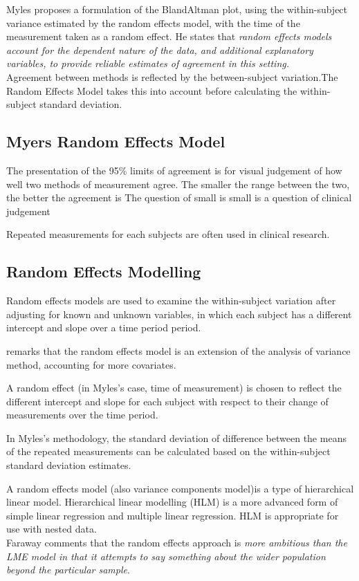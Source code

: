 \documentclass[12pt, a4paper]{report}
\theoremstyle{plain}
\theoremstyle{definition}
\theoremstyle{remark}
\begin{document}
Myles proposes a formulation of the BlandAltman
plot, using the within-subject variance estimated by the random
effects model, with the time of the measurement taken as a random
effect. He states that \emph{random effects models account for the
	dependent nature of the data, and additional explanatory
	variables, to provide reliable estimates of agreement in this
	setting.}
\\
Agreement between methods is reflected by the between-subject
variation.The Random Effects Model takes this into account before
calculating the within-subject standard deviation.

\subsection{Myers Random Effects Model} The presentation of the
95\% limits of agreement is for visual judgement of how well two
methods of measurement agree. The smaller the range between the
two, the better the agreement is The question of small is small is
a question of clinical judgement


Repeated measurements for each subjects are often used in clinical
research.



\subsection{Random Effects Modelling}
Random effects models are used to examine the within-subject
variation after adjusting for known and unknown variables, in
which each subject has a different intercept and slope over a time
period period.


\citet{Myles} remarks that the random effects model is an
extension of the analysis of variance method, accounting for more
covariates.

A random effect (in Myles's case, time of measurement) is chosen
to reflect the different intercept and slope for each subject with
respect to their change of measurements over the time period.

In Myles's methodology, the standard deviation of difference
between the means of the repeated measurements can be calculated
based on the within-subject standard deviation estimates.

A random effects model (also variance components model)is a type
of hierarchical linear model. Hierarchical linear modelling (HLM)
is a more advanced form of simple linear regression and multiple
linear regression. HLM is appropriate for use with nested
data.\\Faraway comments that the random effects approach is
\emph{more ambitious than the LME model in that it attempts to say
	something about the wider population beyond the particular
	sample}.
\end{document}
